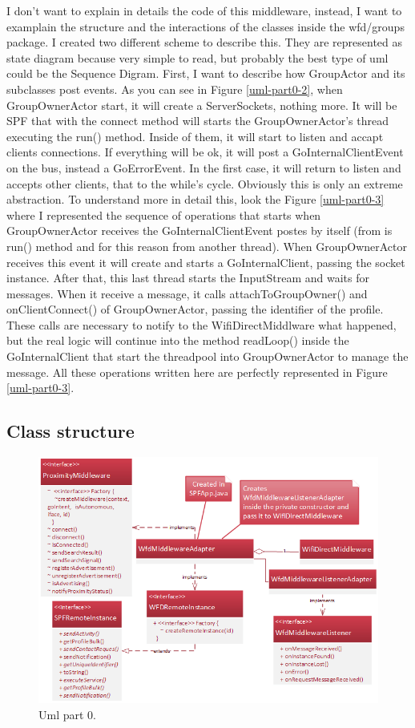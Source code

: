I don't want to explain in details the code of this middleware, instead, I want to examplain the structure and the interactions of the classes inside the wfd/groups package.
I created two different scheme to describe this. They are represented as state diagram because very simple to read, but probably the best type of uml could be the Sequence Digram.
First, I want to describe how GroupActor and its subclasses post events. As you can see in Figure \ref{uml-part0-2}, when GroupOwnerActor start, it will create a ServerSockets, nothing more.
It will be SPF that with the connect method will starts the GroupOwnerActor's thread executing the run() method. Inside of them, it will start to listen and accapt clients connections. If everything will be ok, it will post a GoInternalClientEvent on the bus, instead a GoErrorEvent. In the first case, it will return to listen and accepts other clients, that to the while's cycle. Obviously this is only an extreme abstraction. To understand more in detail this, look the Figure \ref{uml-part0-3} where I represented the sequence of operations that starts when GroupOwnerActor receives the GoInternalClientEvent postes by itself (from is run() method and for this reason from another thread).
When GroupOwnerActor receives this event it will create and starts a GoInternalClient, passing the socket instance.
After that, this last thread starts the InputStream and waits for messages. 
When it receive a message, it calls attachToGroupOwner() and onClientConnect() of GroupOwnerActor, passing the identifier of the profile. These calls are necessary to notify to the WifiDirectMiddlware what happened, but the real logic will continue into the method readLoop() inside the GoInternalClient that start the threadpool into GroupOwnerActor to manage the message.
All these operations written here are perfectly represented in Figure \ref{uml-part0-3}.


\subsection{Class structure}

\begin{figure}[thpb]
	\centering
	\includegraphics[scale=0.5]{./images/chap2/uml-parte1.png}
	\caption{Uml part 0.}
	\label{uml-part1}
\end{figure}	

